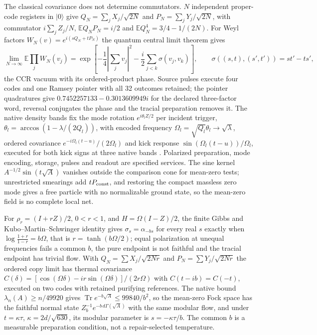 \documentclass[11pt]{article}
\theoremstyle{definition}
\theoremstyle{remark}
\theoremstyle{plain}
\newcommand{\ket}[1]{\lvert #1\rangle}
\newcommand{\Tr}{\operatorname{Tr}}
\newcommand{\Ex}{\mathbb{E}}
\begin{document}
The classical covariance does not determine commutators. $N$ independent
proper-code registers in $\ket0$ give $Q_N=\sum_jX_j/\sqrt{2N}$ and
$P_N=\sum_jY_j/\sqrt{2N}$, with commutator $i\sum_jZ_j/N$,
$\Ex Q_NP_N=i/2$ and $\Ex Q_N^4=3/4-1/(2N)$. For Weyl factors
$W_N(v)=e^{i(sQ_N+tP_N)}$ the quantum central limit theorem \cite{jppIID}
gives
\[
 \lim_{N\to\infty}\Ex\prod_jW_N(v_j)
 =\exp\!\left[-\frac14\left|\sum_jv_j\right|^2
       -\frac i2\sum_{j<k}\sigma(v_j,v_k)\right],
 \qquad \sigma((s,t),(s',t'))=st'-ts',
\]
the CCR vacuum with its ordered-product phase. Source pulses execute four
codes and one Ramsey pointer with all 32 outcomes retained; the pointer
quadratures give $0.7452257133-0.3013609949i$ for the declared three-factor
word, reversal conjugates the phase and the tracial preparation removes it.
The native density bands fix the mode rotation $e^{i\theta_lZ/2}$ per
incident trigger, $\theta_l=\arccos(1-\lambda/(2Q_l))$, with encoded
frequency $\Omega_l=\sqrt{Q_l}\theta_l\to\sqrt\lambda$, ordered covariance
$e^{-i\Omega_l(t-u)}/(2\Omega_l)$ and kick response
$\sin(\Omega_l(t-u))/\Omega_l$, executed for both kick signs at three native
bands \cite{nativeContinuum}. Polarized preparation, mode encoding, storage,
pulses and readout are specified services. The sine kernel
$A^{-1/2}\sin(t\sqrt A)$ vanishes outside the comparison cone for mean-zero
tests; unrestricted smearings add $tP_{\rm const}$, and restoring the compact
massless zero mode gives a free particle with no normalizable ground state,
so the mean-zero field is no complete local net.

For $\rho_r=(I+rZ)/2$, $0<r<1$, and $H=\Omega(I-Z)/2$, the finite Gibbs and
Kubo--Martin--Schwinger identity gives $\sigma_s=\alpha_{-bs}$ for every real
$s$ exactly when $\log\frac{1+r}{1-r}=b\Omega$, that is
$r=\tanh(b\Omega/2)$; equal polarization at unequal frequencies fails a
common $b$, the pure endpoint is not faithful and the tracial endpoint has
trivial flow. With $Q_N=\sum X_j/\sqrt{2Nr}$ and $P_N=\sum Y_j/\sqrt{2Nr}$
the ordered copy limit has thermal covariance
$C(\delta)=[\cos(\Omega\delta)-ir\sin(\Omega\delta)]/(2r\Omega)$ with
$C(t-ib)=C(-t)$, executed on two codes with retained purifying references.
The native bound $\lambda_n(A)\ge n/49920$ gives $\Tr e^{-b\sqrt A}\le99840/b^2$,
so the mean-zero Fock space has the faithful normal state
$Z_b^{-1}e^{-b\,d\Gamma(\sqrt A)}$ with the same modular flow, and under
$t=\kappa\tau$, $\kappa=2d/\sqrt{630}$, its modular parameter is
$s=-\kappa\tau/b$. The common $b$ is a measurable preparation condition,
not a repair-selected temperature.
\end{document}
